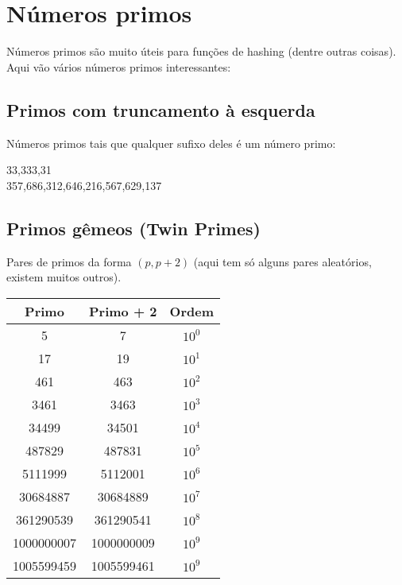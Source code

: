 \section{Números primos}

Números primos são muito úteis para funções de hashing (dentre outras coisas). Aqui vão vários números primos interessantes:


\subsection{Primos com truncamento à esquerda}

Números primos tais que qualquer sufixo deles é um número primo:

\begin{center}
\LARGE
33,333,31 \\
\LARGE
357,686,312,646,216,567,629,137
\end{center}


\subsection{Primos gêmeos (Twin Primes)}

Pares de primos da forma $(p, p + 2)$ (aqui tem só alguns pares aleatórios, existem muitos outros).

\begin{table}[h]
  \centering
  \begin{tabular}{|c|c|c|}
    \hline
    \textbf{Primo} & \textbf{Primo + 2} & \textbf{Ordem} \\
    \hline
    5 & 7 & $10^0$ \\
    \hline
    17 & 19 & $10^1$ \\
    \hline
    461 & 463 & $10^2$ \\
    \hline
    3461 & 3463 & $10^3$ \\
    \hline
    34499 & 34501 & $10^4$ \\
    \hline
    487829 & 487831 & $10^5$ \\
    \hline
    5111999 & 5112001 & $10^6$ \\
    \hline
    30684887 & 30684889 & $10^7$ \\
    \hline
    361290539 & 361290541 & $10^8$ \\
    \hline
    1000000007 & 1000000009 & $10^9$ \\
    \hline
    1005599459 & 1005599461 & $10^9$ \\
    \hline
  \end{tabular}
\end{table}


